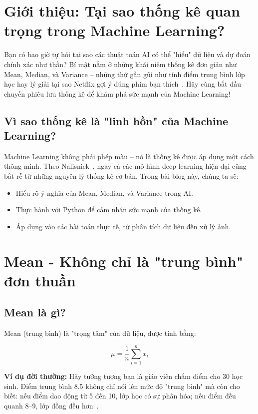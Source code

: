 \section{Giới thiệu: Tại sao thống kê quan trọng trong Machine Learning?}

Bạn có bao giờ tự hỏi tại sao các thuật toán AI có thể "hiểu" dữ liệu và dự đoán chính xác như thần? Bí mật nằm ở những khái niệm thống kê đơn giản như Mean, Median, và Variance – những thứ gần gũi như tính điểm trung bình lớp học hay lý giải tại sao Netflix gợi ý đúng phim bạn thích~\cite{datacamp2024}. Hãy cùng bắt đầu chuyến phiêu lưu thống kê để khám phá sức mạnh của Machine Learning!

\subsection{Vì sao thống kê là "linh hồn" của Machine Learning?}

Machine Learning không phải phép màu – nó là thống kê được áp dụng một cách thông minh. Theo Nalisnick~\cite{nalisnick2023}, ngay cả các mô hình deep learning hiện đại cũng bắt rễ từ những nguyên lý thống kê cơ bản. Trong bài blog này, chúng ta sẽ:

\begin{itemize}
\item Hiểu rõ ý nghĩa của Mean, Median, và Variance trong AI.
\item Thực hành với Python để cảm nhận sức mạnh của thống kê.
\item Áp dụng vào các bài toán thực tế, từ phân tích dữ liệu đến xử lý ảnh.
\end{itemize}

\section{Mean - Không chỉ là "trung bình" đơn thuần}

\subsection{Mean là gì?}

Mean (trung bình) là "trọng tâm" của dữ liệu, được tính bằng:

\[
\mu = \frac{1}{n}\sum_{i=1}^{n} x_i
\]

\textbf{Ví dụ đời thường:} Hãy tưởng tượng bạn là giáo viên chấm điểm cho 30 học sinh. Điểm trung bình 8.5 không chỉ nói lên mức độ "trung bình" mà còn cho biết: nếu điểm dao động từ 5 đến 10, lớp học có sự phân hóa; nếu điểm đều quanh 8–9, lớp đồng đều hơn~\cite{geeksforgeeks2024}.

